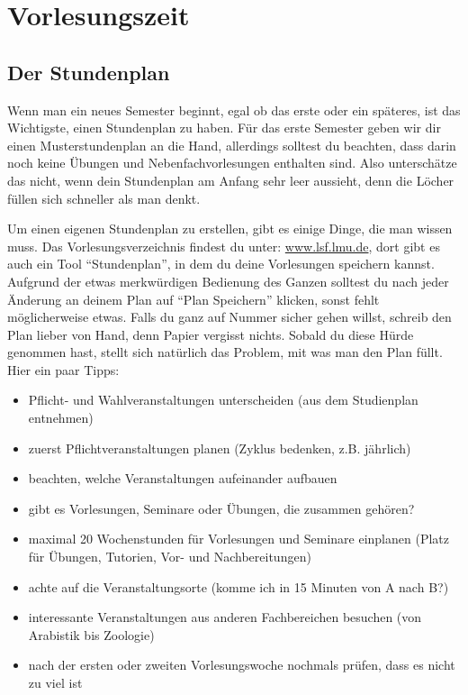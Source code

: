 ﻿
\section{Vorlesungszeit}

\subsection{Der Stundenplan}

Wenn man ein neues Semester beginnt, egal ob das erste oder ein späteres, ist das Wichtigste, einen Stundenplan zu haben. Für das erste Semester geben wir dir einen Musterstundenplan an die Hand, allerdings solltest du beachten, dass darin noch keine Übungen und Nebenfachvorlesungen enthalten sind. Also unterschätze das nicht, wenn dein Stundenplan am Anfang sehr leer aussieht, denn die Löcher füllen sich schneller als man denkt.

Um einen eigenen Stundenplan zu erstellen, gibt es einige Dinge, die man wissen muss. Das Vorlesungsverzeichnis findest du unter: \url{www.lsf.lmu.de}, dort gibt es auch ein Tool ``Stundenplan'', in dem du deine Vorlesungen speichern kannst. Aufgrund der etwas merkwürdigen Bedienung des Ganzen solltest du nach jeder Änderung an deinem Plan auf ``Plan Speichern'' klicken, sonst fehlt möglicherweise etwas. Falls du ganz auf Nummer sicher gehen willst, schreib den Plan lieber von Hand, denn Papier vergisst nichts. Sobald du diese Hürde genommen hast, stellt sich natürlich das Problem, mit was man den Plan füllt. Hier ein paar Tipps:

\begin{itemize}
	\item Pflicht- und Wahlveranstaltungen unterscheiden (aus dem Studienplan entnehmen)
	\item zuerst Pflichtveranstaltungen planen (Zyklus bedenken, z.B. jährlich)
	\item beachten, welche Veranstaltungen aufeinander aufbauen
	\item gibt es Vorlesungen, Seminare oder Übungen, die zusammen gehören?
	\item maximal 20 Wochenstunden für Vorlesungen und Seminare einplanen (Platz für Übungen, Tutorien, Vor- und Nachbereitungen)
	\item achte auf die Veranstaltungsorte (komme ich in 15 Minuten von A nach B?)
	\item interessante Veranstaltungen aus anderen Fachbereichen besuchen (von Arabistik bis Zoologie)
	\item nach der ersten oder zweiten Vorlesungswoche nochmals prüfen, dass es nicht zu viel ist
\end{itemize}

